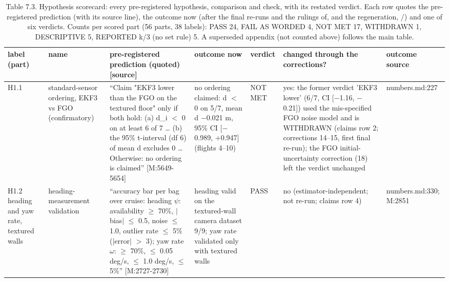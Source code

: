 \begin{table}[htbp]
\centering
\scriptsize
\caption{Table 7.3. Hypothesis scorecard: every pre-registered hypothesis, comparison and check, with its restated verdict. Each row quotes the pre-registered prediction (with its source line), the outcome now (after the final re-runs and the rulings of, and the regeneration, /) and one of six verdicts. Counts per scored part (56 parts, 38 labels): PASS 24, FAIL AS WORDED 4, NOT MET 17, WITHDRAWN 1, DESCRIPTIVE 5, REPORTED k/3 (no set rule) 5. A superseded appendix (not counted above) follows the main table.}
\label{tab:7-3}
\begin{tabular}{p{}p{}p{}p{}p{}p{}p{}}
\toprule
label (part) & name & pre-registered prediction (quoted) [source] & outcome now & verdict & changed through the corrections? & outcome source \\
\midrule
H1.1 & standard-sensor ordering, EKF3 vs FGO (confirmatory) & ``Claim "EKF3 lower than the FGO on the textured floor" only if both hold: (a) d\_i $<$ 0 on at least 6 of 7 \ldots{} (b) the 95\% t-interval (df 6) of mean d excludes 0 \ldots{} Otherwise: no ordering is claimed'' [M:5649-5654] & no ordering claimed: d $<$ 0 on 5/7, mean d $-$0.021 m, 95\% CI [$-$0.989, +0.947] (flights 4--10) & NOT MET & yes: the former verdict 'EKF3 lower' (6/7, CI [$-$1.16, $-$0.21]) used the mis-specified FGO noise model and is WITHDRAWN (claims row 2; corrections 14--15, first final re-run); the FGO initial-uncertainty correction (18) left the verdict unchanged & numbers.md:227 \\
H1.2 heading and yaw rate, textured walls & heading-measurement validation & ``accuracy bar per bag over cruise: heading $\psi$: availability $\ge$ 70\%, $|$bias$|$ $\le$ 0.5\textdegree{}, noise $\le$ 1.0\textdegree{}, outlier rate $\le$ 5\% ($|$error$|$ $>$ 3\textdegree{}); yaw rate $\omega$: $\ge$ 70\%, $\le$ 0.05 deg/s, $\le$ 1.0 deg/s, $\le$ 5\%'' [M:2727-2730] & heading valid on the textured-wall camera dataset 9/9; yaw rate validated only with textured walls & PASS & no (estimator-independent; not re-run; claims row 4) & numbers.md:330; M:2851 \\

\end{tabular}
\end{table}
